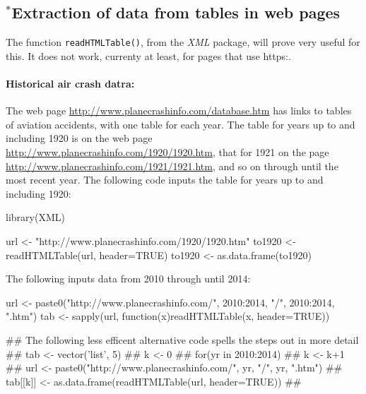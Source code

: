 \documentclass{tufte-book}\usepackage[]{graphicx}\usepackage[]{color}
\newcommand{\txtt}[1]{\texttt{#1}}
\begin{document}
\subsection*{$^*$Extraction of data from tables in web pages}

The function \txtt{readHTMLTable()}, from the {\em XML} package,
will prove very useful for this.  It does not work, currenty at
least, for pages that use https:.

\paragraph{Historical air crash datra:}
The web page \url{http://www.planecrashinfo.com/database.htm}
has links to tables of aviation accidents, with one table for
each year. The table for years up to and including 1920 is on
the web page \url{http://www.planecrashinfo.com/1920/1920.htm},
that for 1921 on the page \url{http://www.planecrashinfo.com/1921/1921.htm},
and so on through until the most recent year.  The following code
inputs the table for years up to and including 1920:

\begin{Schunk}
\begin{Sinput}
library(XML)
\end{Sinput}
\end{Schunk}

\begin{Schunk}
\begin{Sinput}
url <- "http://www.planecrashinfo.com/1920/1920.htm"
to1920 <- readHTMLTable(url, header=TRUE)
to1920 <- as.data.frame(to1920)
\end{Sinput}
\end{Schunk}

The following inputs data from 2010 through until 2014:
\begin{fullwidth}

\begin{Schunk}
\begin{Sinput}
url <- paste0("http://www.planecrashinfo.com/",
              2010:2014, "/", 2010:2014, ".htm")
tab <- sapply(url, function(x)readHTMLTable(x, header=TRUE))
\end{Sinput}
\end{Schunk}

\end{fullwidth}

{\small
\begin{fullwidth}

\begin{Schunk}
\begin{Sinput}
## The following less efficent alternative code spells the steps out in more detail
## tab <- vector('list', 5)
## k <- 0
## for(yr in 2010:2014){
##  k <- k+1
##  url <- paste0("http://www.planecrashinfo.com/", yr, "/", yr, ".htm")
##  tab[[k]] <- as.data.frame(readHTMLTable(url, header=TRUE))
## }
\end{Sinput}
\end{Schunk}

\end{fullwidth}
}
\end{document}
